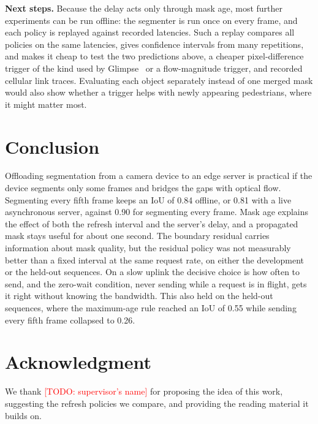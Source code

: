 \documentclass[conference]{IEEEtran}
\newcommand{\todo}[1]{\textcolor{red}{[TODO: #1]}}
\begin{document}
\textbf{Next steps.} Because the delay acts only through mask age, most further experiments can be run offline: the segmenter is run once on every frame, and each policy is replayed against recorded latencies. Such a replay compares all policies on the same latencies, gives confidence intervals from many repetitions, and makes it cheap to test the two predictions above, a cheaper pixel-difference trigger of the kind used by Glimpse~\cite{chen2015glimpse} or a flow-magnitude trigger, and recorded cellular link traces. Evaluating each object separately instead of one merged mask would also show whether a trigger helps with newly appearing pedestrians, where it might matter most.

\section{Conclusion}

Offloading segmentation from a camera device to an edge server is practical if the device segments only some frames and bridges the gaps with optical flow. Segmenting every fifth frame keeps an IoU of 0.84 offline, or 0.81 with a live asynchronous server, against 0.90 for segmenting every frame. Mask age explains the effect of both the refresh interval and the server's delay, and a propagated mask stays useful for about one second. The boundary residual carries information about mask quality, but the residual policy was not measurably better than a fixed interval at the same request rate, on either the development or the held-out sequences. On a slow uplink the decisive choice is how often to send, and the zero-wait condition, never sending while a request is in flight, gets it right without knowing the bandwidth. This also held on the held-out sequences, where the maximum-age rule reached an IoU of 0.55 while sending every fifth frame collapsed to 0.26.

\section*{Acknowledgment}

We thank \todo{supervisor's name} for proposing the idea of this work, suggesting the refresh policies we compare, and providing the reading material it builds on.



\end{document}
